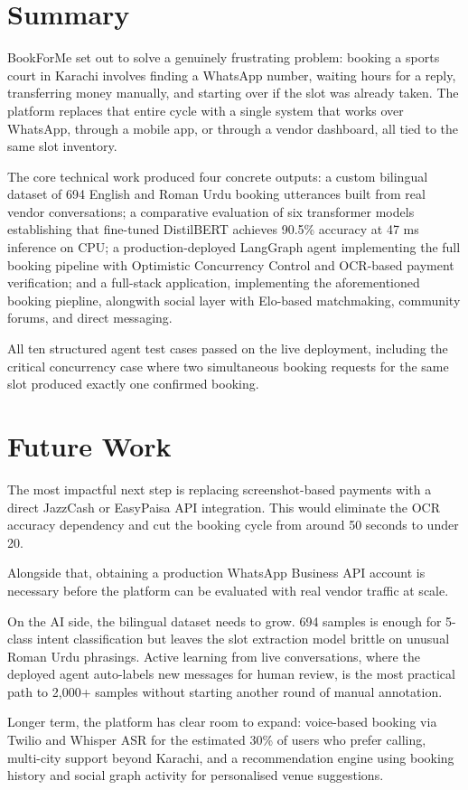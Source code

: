 \section{Summary}
\label{sec:outro-summary}

BookForMe set out to solve a genuinely frustrating problem: booking a sports court
in Karachi involves finding a WhatsApp number, waiting hours for a reply,
transferring money manually, and starting over if the slot was already taken. The
platform replaces that entire cycle with a single system that works over WhatsApp,
through a mobile app, or through a vendor dashboard, all tied to the same slot
inventory.

The core technical work produced four concrete outputs: a custom bilingual
dataset of 694 English and Roman Urdu booking utterances built from real vendor
conversations; a comparative evaluation of six transformer models establishing that
fine-tuned DistilBERT achieves 90.5\% accuracy at 47 ms inference on CPU; a
production-deployed LangGraph agent implementing the full booking pipeline with
Optimistic Concurrency Control and OCR-based payment verification; and a full-stack application, implementing the aforementioned booking piepline, alongwith social
layer with Elo-based matchmaking, community forums, and direct messaging.

All ten structured agent test cases passed on the live deployment, including the
critical concurrency case where two simultaneous booking requests for the same
slot produced exactly one confirmed booking.

\section{Future Work}
\label{sec:outro-future}

The most impactful next step is replacing screenshot-based payments with a direct
JazzCash or EasyPaisa API integration. This would eliminate the OCR accuracy
dependency and cut the booking cycle from around 50 seconds to under 20.

Alongside that, obtaining a production WhatsApp Business API account is necessary before the platform can be evaluated with
real vendor traffic at scale.

On the AI side, the bilingual dataset needs to grow. 694 samples is enough for
5-class intent classification but leaves the slot extraction model brittle on
unusual Roman Urdu phrasings. Active learning from live conversations, where the
deployed agent auto-labels new messages for human review, is the most practical
path to 2,000+ samples without starting another round of manual annotation.

Longer term, the platform has clear room to expand: voice-based booking via Twilio
and Whisper ASR for the estimated 30\% of users who prefer calling, multi-city
support beyond Karachi, and a recommendation engine using booking history and
social graph activity for personalised venue suggestions.

